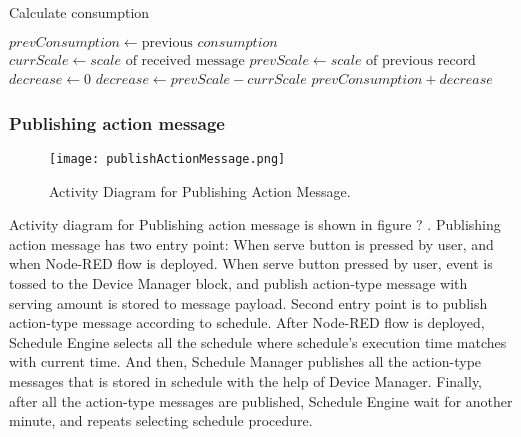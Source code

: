 \documentclass[conference]{IEEEtran}
\begin{document}
\begin{algorithm}
\caption{Calculate consumption}\label{algo}
\begin{algorithmic}[1]
        \State $prevConsumption \gets \text{previous } \textit{consumption}$
        \State $currScale \gets \textit{scale} \text{ of received message}$
        \State $prevScale \gets \textit{scale} \text{ of  previous record}$
        \State $decrease \gets 0$
            \State $decrease \gets prevScale - currScale$
        \EndIf
        \Return $prevConsumption + decrease$
    \EndProcedure
\end{algorithmic}
\end{algorithm}

\subsubsection{Publishing action message}
\begin{figure}[htbp]
\centerline{\texttt{[image: publishActionMessage.png]}}
\caption{Activity Diagram for Publishing Action Message.}
\label{fig}
\end{figure}
Activity diagram for Publishing action message is shown in figure ?
. Publishing action message has two entry point: When serve button is pressed by user, and when Node-RED flow is deployed. When serve button pressed by user, event is tossed to the Device Manager block, and publish action-type message with serving amount is stored to message payload. Second entry point is to publish action-type message according to schedule. After Node-RED flow is deployed, Schedule Engine selects all the schedule where schedule’s execution time matches with current time. And then, Schedule Manager publishes all the action-type messages that is stored in schedule with the help of Device Manager. Finally, after all the action-type messages are published, Schedule Engine wait for another minute, and repeats selecting schedule procedure.

\hfill \break
\end{document}
